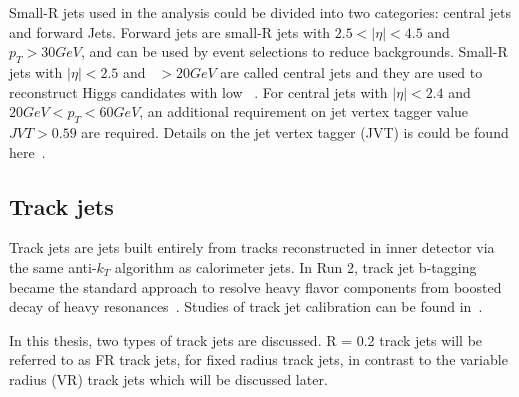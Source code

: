 \par Small-R jets used in the analysis could be divided into two categories: central jets and forward Jets. Forward jets are small-R jets with $2.5 < |\eta| < 4.5$ and $p_T > 30 GeV$, and can be used by event selections to reduce backgrounds.
 Small-R jets with $|\eta| < 2.5$ and \pt~$> 20 GeV$ are called central jets and they are used to reconstruct Higgs candidates with low \pt~.
For central jets with $|\eta| < 2.4$ and $20 GeV < p_T < 60 GeV$, an additional requirement on jet vertex tagger value $JVT > 0.59$ are required. Details on the jet vertex tagger (JVT) is could be found here~\cite{Aad:2015ina}.



\subsection{Track jets}
\label{sec:track}


\par Track jets are jets built entirely from tracks reconstructed in inner detector via the same anti-$k_T$ algorithm as calorimeter jets. In Run 2, track jet b-tagging became the standard approach to resolve heavy flavor components from boosted decay of heavy resonances~\cite{ATL-PHYS-PUB-2015-035,ATLAS-CONF-2016-039}. Studies of track jet calibration can be found in~\cite{VanDenWollenberg:1981533}. 
\par In this thesis, two types of track jets are discussed. R = 0.2 track jets will be referred to as FR track jets, for fixed radius track jets, in contrast to the variable radius (VR) track jets which will be discussed later.

